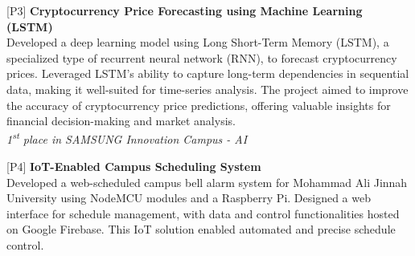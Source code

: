 \begin{cventries}
\begin{rSection}{}
    {\hspace{-1.5em}[P3]\hspace{1em}}{\bodyfont\bfseries\color{darktext} {Cryptocurrency Price Forecasting using Machine Learning (LSTM) \hspace{1em} \href{https://www.datacamp.com/datalab/w/59d76458-67c7-4a1f-bbcf-b8adb52c171e#cryptocurrency-price-forecasting-using-machine-learning-lstm} {\Large{\faLaptop}}}}
    \\\hspace{1.2em}Developed a deep learning model using Long Short-Term Memory (LSTM), a specialized type of recurrent neural network (RNN), to forecast cryptocurrency prices. Leveraged LSTM's ability to capture long-term dependencies in sequential data, making it well-suited for time-series analysis. The project aimed to improve the accuracy of cryptocurrency price predictions, offering valuable insights for financial decision-making and market analysis.
    \\  \hspace{0.5em} \emph{1\textsuperscript{st} place in SAMSUNG Innovation Campus - AI}
    \vspace{-0.2em}
    \end{rSection}
\begin{rSection}{}
{\hspace{-1.5em}[P4]\hspace{1em}}{\bodyfont\bfseries\color{darktext} {IoT-Enabled Campus Scheduling System \hspace{1em} \href{https://maju-iot.web.app/}{\large{\faGlobe}}}}
\\\hspace{1.2em}Developed a web-scheduled campus bell alarm system for Mohammad Ali Jinnah University using NodeMCU modules and a Raspberry Pi. Designed a web interface for schedule management, with data and control functionalities hosted on Google Firebase. This IoT solution enabled automated and precise schedule control.
\end{rSection}

\end{cventries}